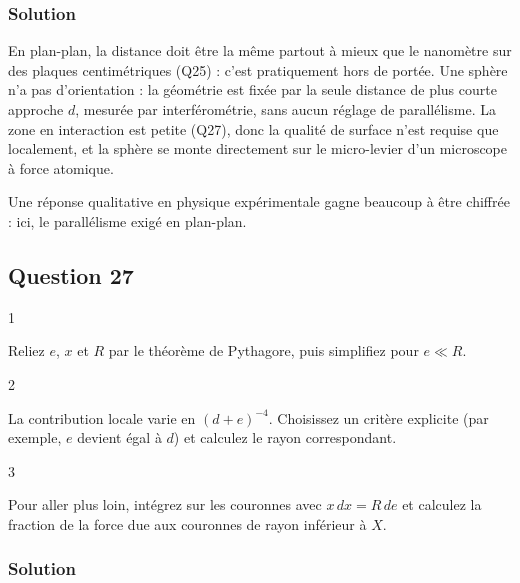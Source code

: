 \documentclass[11pt,a4paper]{article}
\begin{document}
\hypertarget{solution-25}{%
\subsubsection{Solution}\label{solution-25}}

En plan-plan, la distance doit être la même partout à mieux que le nanomètre sur des plaques centimétriques (Q25) : c'est pratiquement hors de portée. Une sphère n'a pas d'orientation : la géométrie est fixée par la seule distance de plus courte approche \(d\), mesurée par interférométrie, sans aucun réglage de parallélisme. La zone en interaction est petite (Q27), donc la qualité de surface n'est requise que localement, et la sphère se monte directement sur le micro-levier d'un microscope à force atomique.

\begin{methode}

Une réponse qualitative en physique expérimentale gagne beaucoup à être chiffrée : ici, le parallélisme exigé en plan-plan.

\end{methode}

\hypertarget{question-27}{%
\subsection{Question 27}\label{question-27}}

\begin{indication}{1}

Reliez \(e\), \(x\) et \(R\) par le théorème de Pythagore, puis simplifiez pour \(e\ll R\).

\end{indication}

\begin{indication}{2}

La contribution locale varie en \((d+e)^{-4}\). Choisissez un critère explicite (par exemple, \(e\) devient égal à \(d\)) et calculez le rayon correspondant.

\end{indication}

\begin{indication}{3}

Pour aller plus loin, intégrez sur les couronnes avec \(x\,dx=R\,de\) et calculez la fraction de la force due aux couronnes de rayon inférieur à \(X\).

\end{indication}

\hypertarget{solution-26}{%
\subsubsection{Solution}\label{solution-26}}
\end{document}
